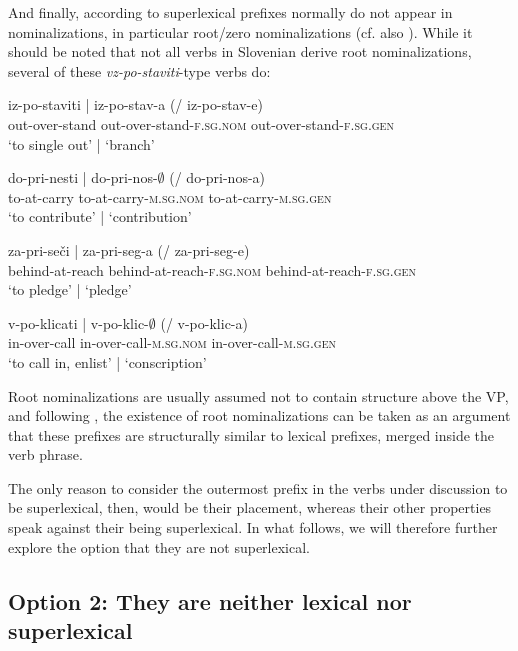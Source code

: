 \documentclass[output=paper,colorlinks,citecolor=brown]{langscibook}
\begin{document}
\noindent And finally, according to \citet{svenonius2004slavic} superlexical prefixes normally do not appear in nominalizations, in particular root/zero nominalizations (cf. also \citealt{cahazikova2016}). While it should be noted that not all verbs in Slovenian derive root nominalizations, several of these \textit{vz-po-staviti}-type verbs do:

\ea 
\glll  iz-po-staviti | iz-po-stav-a (/ iz-po-stav-e)\\
 out-over-stand  {} out-over-stand-\textsc{f.sg.nom} {} out-over-stand-\textsc{f.sg.gen}\\
{`to single out'}  |   {`branch'} \label{ex:izpostava} \\
\z

\ea 
\glll  do-pri-nesti  |  do-pri-nos-$\emptyset$ (/ do-pri-nos-a)\\
to-at-carry {} to-at-carry-\textsc{m.sg.nom} {} to-at-carry-\textsc{m.sg.gen}\\
{`to contribute'} |  {`contribution'} \label{ex:doprinos} \\
\z

\ea 
\glll  za-pri-seči  |  za-pri-seg-a (/ za-pri-seg-e)\\
behind-at-reach {} behind-at-reach-\textsc{f.sg.nom} {} behind-at-reach-\textsc{f.sg.gen}\\
{`to pledge'} |  {`pledge'} \label{ex:zaprisega} \\
\z

\ea 
\glll  v-po-klicati  |  v-po-klic-$\emptyset$ (/ v-po-klic-a)\\
in-over-call {} in-over-call-\textsc{m.sg.nom} {} in-over-call-\textsc{m.sg.gen}\\
{`to call in, enlist'} |  {`conscription'} \label{ex:vpoklic} \\
\z

\noindent Root nominalizations are usually assumed not to contain structure above the VP, and following \citet{svenonius2004slavic}, the existence of root nominalizations can be taken as an argument that these prefixes are structurally similar to lexical prefixes, merged inside the verb phrase. 

The only reason to consider the outermost prefix in the verbs under discussion to be superlexical, then, would be their placement, whereas their other properties speak against their being superlexical. In what follows, we will therefore further explore the option that they are not superlexical. 

\subsection{Option 2: They are neither lexical nor superlexical}\label{sec:intermediate}
 
\end{document}
